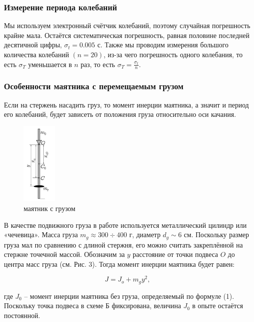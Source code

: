 \documentclass[12pt, a4paper]{article}
\begin{document}
\subsubsection{Измерение периода колебаний}

Мы используем электронный счётчик колебаний, поэтому случайная погрешность
крайне мала. Остаётся систематическая погрешность, равная половине последней
десятичной цифры, $\sigma_t = 0.005$ с. Также мы проводим измерения большого
количества колебаний $(n = 20)$, из-за чего погрешность одного колебания,
то есть $\sigma_T$ уменьшается в $n$ раз, то есть 
$\sigma_T = \frac{\sigma_t}{n}$.

\subsubsection{Особенности маятника с перемещаемым грузом}

Если на стержень насадить груз, то момент инерции маятника, а значит
и период его колебаний, будет зависеть от положения груза относительно
оси качания.

\begin{figure}
    \centering
    \includegraphics[width = 0.15\textwidth]{Figure 3}
    \caption{маятник с грузом}
\end{figure}

В качестве подвижного груза в работе используется металлический цилиндр или
«чечевица». Масса груза $m_g \approx 300 \div 400$ г, диаметр $d_g \sim 6$ см.
Поскольку размер груза мал по сравнению с длиной стержня, его можно
считать закреплённой на стержне точечной массой. Обозначим за $y$ расстояние
от точки подвеса $O$ до центра масс груза (см. Рис. 3). Тогда момент инерции
маятника будет равен:

\[J = J_o + m_gy^2,\]

где $J_0$ -- момент инерции маятника без груза, определяемый по формуле (1).
Поскольку точка подвеса в схеме Б фиксирована, величина $J_0$ в опыте остаётся
постоянной.
\end{document}
